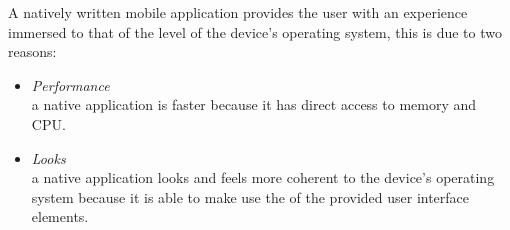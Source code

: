 A natively written mobile application provides the user with an experience immersed to that of the level of the device's operating system, this is due to two reasons:
\begin{itemize}
\item
\emph{Performance}\\
a native application is faster because it has direct access to memory and CPU.
\item \emph{Looks}\\
a native application looks and feels more coherent to the device's operating system because it is able to make use the of the provided user interface elements.
\end{itemize}